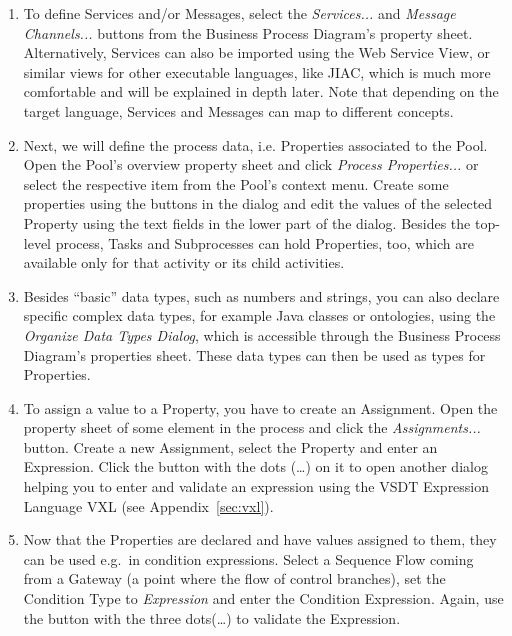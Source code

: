 \begin{enumerate}

	\item To define Services and/or Messages, select the \emph{Services...} and
	\emph{Message Channels...} buttons from the Business Process Diagram's property
	sheet.  Alternatively, Services can also be imported using the Web Service
	View, or similar views for other executable languages, like JIAC, which is
	much more comfortable and will be explained in depth later.  Note that depending
	on the target language, Services and Messages can map to different concepts.

	\item Next, we will define the process data, i.e. Properties associated to
	the Pool.  Open the Pool's overview property sheet and click \emph{Process
	Properties...} or select the respective item from the Pool's context menu.
	Create some properties using the buttons in the dialog and edit the values of
	the selected Property using the text fields in the lower part of the dialog.
	Besides the top-level process, Tasks and Subprocesses can hold Properties,
	too, which are available only for that activity or its child activities.
	
	\item Besides ``basic'' data types, such as numbers and strings, you can also
	declare specific complex data types, for example Java classes or ontologies,
	using the \emph{Organize Data Types Dialog}, which is accessible through the
	Business Process Diagram's properties sheet.  These data types can then be
	used as types for Properties.
	
	\item To assign a value to a Property, you have to create an Assignment.  Open
	the property sheet of some element in the process and click the \emph{Assignments...}
	button.  Create a new Assignment, select the Property and enter an Expression.
	Click the button with the dots (\dots) on it to open another dialog helping
	you to enter and validate an expression using the VSDT Expression Language
	VXL (see Appendix~\ref{sec:vxl}).
	
	\item Now that the Properties are declared and have values assigned to them,
	they can be used e.g.\ in condition expressions.  Select a Sequence Flow
	coming from a Gateway (a point where the flow of control branches), set the
	Condition Type to \emph{Expression} and enter the Condition Expression.
	Again, use the button with the three dots(\dots) to validate the Expression.
	

\end{enumerate}
